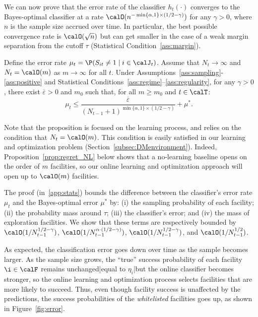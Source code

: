 \documentclass[blindrev]{informs3noheader}
\begin{document}
We can now prove that the error rate of the classifier $h_t(\cdot)$ converges to the Bayes-optimal classifier at a rate $\calO(n^{-\min\{\alpha,1\}\times (1/2-\gamma)})$ for any $\gamma>0$, where $n$ is the sample size accrued over time. In particular, the best possible convergence rate is $\calO(\sqrt n)$ but can get smaller in the case of a weak margin separation from the cutoff $\tau$ (Statistical Condition~\ref{ass:margin}).
\begin{proposition}\label{prop:MLE}
     Define the error rate $\mu_t = \P(S_{it}\neq 1 \mid i\in\calJ_t)$. Assume that $N_t \to \infty$ and $N_t=\calO(m)$ as $m \to \infty$ for all $t$. Under Assumptions~\ref{ass:sampling}-\ref{ass:positive} and Statistical Conditions~\ref{ass:regime}--\ref{ass:regularity}, for any $\gamma>0$, there exist $\overline\varepsilon>0$ and $m_0$ such that, for all $m\geq m_0$ and $t\in\calT$:
    \[\mu_t \leq \frac{\overline\varepsilon}{(N_{t-1}+1)^{\min\{\alpha,1\}\times (1/2-\gamma)}}+\mu^*.\]
\end{proposition}

Note that the proposition is focused on the learning process, and relies on the condition that $N_t=\calO(m)$. This condition is easily satisfied in our learning and optimization problem (Section~\ref{subsec:DMenvironment}). Indeed, Proposition~\ref{prop:regret_NL} below shows that a no-learning baseline opens on the order of $m$ facilities, so our online learning and optimization approach will open up to $\calO(m)$ facilities.

The proof (in~\ref{app:stats}) bounds the difference between the classifier's error rate $\mu_t$ and the Bayes-optimal error $\mu^*$ by: (i) the sampling probability of each facility; (ii) the probability mass around $\tau$; (iii) the classifier's error; and (iv) the mass of exploration facilities. We show that these terms are respectively bounded by $\calO(1/N_{t-1}^{1/2-\gamma})$, $\calO(1/N_{t-1}^{\alpha\cdot(1/2-\gamma)})$, $\calO(1/N_{t-1}^{1/2-\gamma})$, and $\calO(1/N_{t-1}^{1/2})$.

As expected, the classification error goes down over time as the sample becomes larger. As the sample size grows, the ``true'' success probability of each facility $\i\in\calF$ remains unchanged|equal to $\eta_i$|but the online classifier becomes stronger, so the online learning and optimization process selects facilities that are more likely to succeed. Thus, even though facility success is unaffected by the predictions, the success probabilities of the \textit{whitelisted} facilities goes up, as shown in Figure~\ref{fig:error}.
\end{document}

